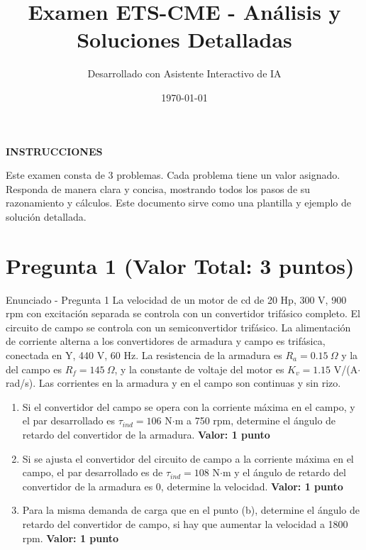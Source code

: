 \documentclass[12pt]{article}
\title{Examen ETS-CME - Análisis y Soluciones Detalladas}
\author{Desarrollado con Asistente Interactivo de IA}
\date{\today}
\begin{document}
\maketitle

\begin{center}
\large\textbf{INSTRUCCIONES}
\end{center}

Este examen consta de 3 problemas. Cada problema tiene un valor asignado.\\
Responda de manera clara y concisa, mostrando todos los pasos de su razonamiento y cálculos. Este documento sirve como una plantilla y ejemplo de solución detallada.

\vspace{0.5cm}

\section{Pregunta 1 (Valor Total: 3 puntos)}
\begin{problemstatementbox}{Enunciado - Pregunta 1}
La velocidad de un motor de cd de 20 Hp, 300 V, 900 rpm con excitación separada se controla con un convertidor trifásico completo. El circuito de campo se controla con un semiconvertidor trifásico. La alimentación de corriente alterna a los convertidores de armadura y campo es trifásica, conectada en Y, 440 V, 60 Hz. La resistencia de la armadura es $R_a = 0.15\ \Omega$ y la del campo es $R_f = 145\ \Omega$, y la constante de voltaje del motor es $K_v = 1.15$ V/(A$\cdot$rad/s). Las corrientes en la armadura y en el campo son continuas y sin rizo.

\begin{enumerate}[label=\alph*)]
    \item Si el convertidor del campo se opera con la corriente máxima en el campo, y el par desarrollado es $\tau_{ind} = 106$ N$\cdot$m a 750 rpm, determine el ángulo de retardo del convertidor de la armadura. \textbf{Valor: 1 punto}
    
    \item Si se ajusta el convertidor del circuito de campo a la corriente máxima en el campo, el par desarrollado es de $\tau_{ind} = 108$ N$\cdot$m y el ángulo de retardo del convertidor de la armadura es 0, determine la velocidad. \textbf{Valor: 1 punto}
    
    \item Para la misma demanda de carga que en el punto (b), determine el ángulo de retardo del convertidor de campo, si hay que aumentar la velocidad a 1800 rpm. \textbf{Valor: 1 punto}
\end{enumerate}
\end{problemstatementbox}
\end{document}
